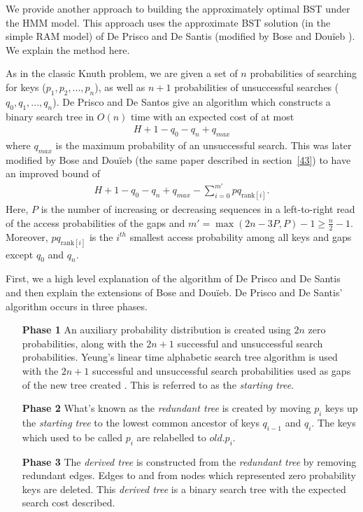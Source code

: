 \documentclass[letterpaper,12pt,titlepage,oneside,final]{book}
\theoremstyle{plain}
\begin{document}
We provide another approach to building the approximately optimal BST under the HMM model. This approach uses the approximate BST solution (in the simple RAM model) of De Prisco and De Santis \cite{de1993binary} (modified by Bose and Dou\"{i}eb \cite{bose2009efficient}). We explain the method here.

As in the classic Knuth problem, we are given a set of $n$ probabilities of searching for keys ($p_1, p_2, ..., p_n$), as well as $n+1$ probabilities of unsuccessful searches ($q_0, q_1, ..., q_n$). De Prisco and De Santos give an algorithm which constructs a binary search tree in $O(n)$ time with an expected cost of at most \cite{de1993binary}
\begin{align*}
H+1-q_0-q_n+q_{max}
\end{align*}
  where $q_{max}$ is the maximum probability of an unsuccessful search. This was later modified by Bose and Dou\"{i}eb (the same paper described in section~\ref{43}) to have an improved bound of \cite{bose2009efficient}
\begin{align*}
H + 1 - q_0 - q_n + q_{max} - \sum_{i=0}^{m'} pq_{\text{rank}[i]}.
\end{align*}
Here, $P$ is the number of increasing or decreasing sequences in a left-to-right read of the access probabilities of the gaps and $m'=\max({2n-3P,P})-1 \geq \frac{n}{2} - 1$.  Moreover, $pq_{\text{rank}[i]}$ is the $i^{th}$ smallest access probability among all keys and gaps except $q_0$ and $q_n$.

First, we a high level explanation of the algorithm of De Prisco and De Santis and then explain the extensions of Bose and Dou\"{i}eb. De Prisco and De Santis' algorithm occurs in three phases.

\begin{itemize}
\item[\textbf{Phase 1}] An auxiliary probability distribution is created using $2n$ zero probabilities, along with the $2n+1$ successful and unsuccessful search probabilities. Yeung's linear time alphabetic search tree algorithm is used with the $2n+1$ successful and unsuccessful search probabilities used as gaps of the new tree created \cite{yeung1991alphabetic}. This is referred to as the \textit{starting tree}.

\item[\textbf{Phase 2}] What's known as the \textit{redundant tree} is created by moving $p_i$ keys up the \textit{starting tree} to the lowest common ancestor of keys $q_{i-1}$ and $q_i$. The keys which used to be called $p_i$ are relabelled to $old.p_i$.

\item[\textbf{Phase 3}] The \textit{derived tree} is constructed from the \textit{redundant tree} by removing redundant edges. Edges to and from nodes which represented zero probability keys are deleted. This \textit{derived tree} is a binary search tree with the expected search cost described.
\end{itemize}
\end{document}
